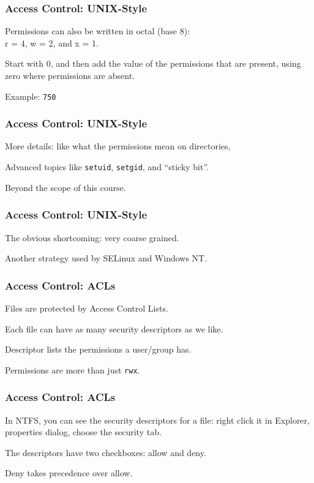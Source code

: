 \begin{frame}
\frametitle{Access Control: UNIX-Style}


Permissions can also be written in octal (base 8): \\
\quad r = 4, w = 2, and x = 1. 

Start with 0, and then add the value of the  permissions that are present, using zero where permissions are absent. 

Example: \texttt{750} 


\end{frame}

\begin{frame}
\frametitle{Access Control: UNIX-Style}


More details: like what the permissions mean on directories, 

Advanced topics like \texttt{setuid}, \texttt{setgid}, and ``sticky bit''.

Beyond the scope of this course.


\end{frame}

\begin{frame}
\frametitle{Access Control: UNIX-Style}


The obvious shortcoming: very coarse grained.

Another strategy used by SELinux and Windows NT.


\end{frame}

\begin{frame}
\frametitle{Access Control: ACLs}


Files are protected by Access Control Lists.

Each file can have as many security descriptors as we like.

Descriptor lists the permissions a user/group has.

Permissions are more than just \texttt{rwx}.


\end{frame}

\begin{frame}
\frametitle{Access Control: ACLs}


In NTFS, you can see the security descriptors for a file: right click it in Explorer, properties dialog, choose the security tab. 

The descriptors have two checkboxes: allow and deny. 

Deny takes precedence over allow.


\end{frame}

